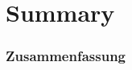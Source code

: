 \documentclass{beamer}
\begin{document}
\begin{frame}
\begin{center}
\begin{tikzpicture}
      \end{tikzpicture}     
    \end{center}        
    
  \end{frame}
  
  \section{Summary}
  \begin{frame}
    \frametitle{Zusammenfassung}
  \end{frame}
  
\end{document}
